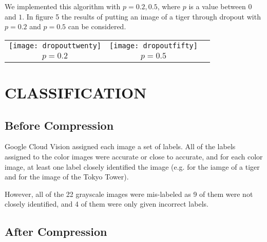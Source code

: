 \documentclass[letterpaper, 10 pt, conference]{ieeeconf}  %
\begin{document}
We implemented this algorithm with $p=0.2,0.5$, where $p$ is a value between $0$ and $1$.
In figure 5 the results of putting an image of a tiger through dropout
with $p=0.2$ and $p=0.5$ can be considered.

\vspace*{3mm}
\begin{tabular}{c c c}
	\texttt{[image: dropouttwenty]} &
		\texttt{[image: dropoutfifty]} \\
	$p=0.2$ & $p=0.5$ \\
\end{tabular}

\vspace*{3mm}

\section{CLASSIFICATION}

\subsection{Before Compression}

Google Cloud Vision assigned each image a set of labels.
All of the labels assigned to the color images were
accurate or close to accurate, and for each color image,
at least one label closely identified the image (e.g. 
for the iamge of a tiger and  for the image of
the Tokyo Tower).

However, all of the 22 grayscale images were mis-labeled as  9 of them were not closely identified, and 4 of them
were only given incorrect labels.

\subsection{After Compression}

\vspace*{2mm}
\end{document}
